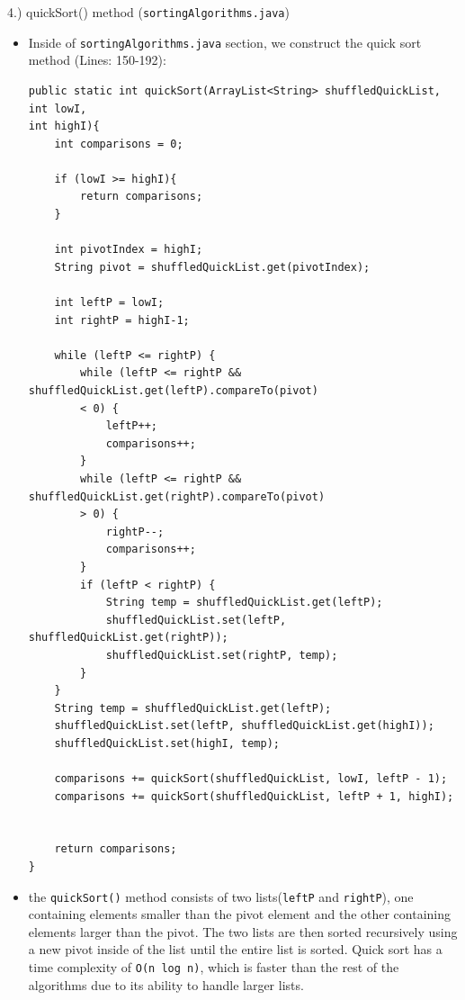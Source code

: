 \documentclass[a4paper,12pt]{article}
\begin{document}
\begin{large}
    4.) quickSort() method (\verb|sortingAlgorithms.java|)
\end{large}


\begin{itemize}
\item Inside of \verb|sortingAlgorithms.java| section, we construct the quick sort method (Lines: 150-192):

\begin{verbatim}
public static int quickSort(ArrayList<String> shuffledQuickList, int lowI, 
int highI){
    int comparisons = 0;

    if (lowI >= highI){
        return comparisons;
    }

    int pivotIndex = highI;
    String pivot = shuffledQuickList.get(pivotIndex);

    int leftP = lowI;
    int rightP = highI-1;

    while (leftP <= rightP) {
        while (leftP <= rightP && shuffledQuickList.get(leftP).compareTo(pivot) 
        < 0) {
            leftP++;
            comparisons++;
        }
        while (leftP <= rightP && shuffledQuickList.get(rightP).compareTo(pivot) 
        > 0) {
            rightP--;
            comparisons++;
        }
        if (leftP < rightP) {
            String temp = shuffledQuickList.get(leftP);
            shuffledQuickList.set(leftP, shuffledQuickList.get(rightP));
            shuffledQuickList.set(rightP, temp);
        }
    }
    String temp = shuffledQuickList.get(leftP);
    shuffledQuickList.set(leftP, shuffledQuickList.get(highI));
    shuffledQuickList.set(highI, temp);

    comparisons += quickSort(shuffledQuickList, lowI, leftP - 1);
    comparisons += quickSort(shuffledQuickList, leftP + 1, highI);


    return comparisons;
}	
\end{verbatim}
\item the \verb|quickSort()| method consists of two lists(\verb|leftP| and \verb|rightP|), one containing elements smaller than the pivot element and the other containing elements larger than the pivot. The two lists are then sorted recursively using a new pivot inside of the list until the entire list is sorted. Quick sort has a time complexity of \verb|O(n log n)|, which is faster than the rest of the algorithms due to its ability to handle larger lists.\\

\end{itemize}
\end{document}
